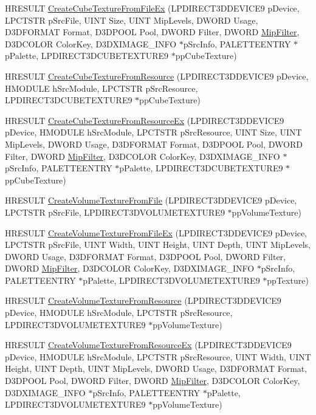 \begin{DoxyCompactItemize}
\item 
HRESULT \hyperlink{class_c_d_x_u_t_resource_cache_a3c03e924cfd9af63363f5976f266c14e}{CreateCubeTextureFromFileEx} (LPDIRECT3DDEVICE9 pDevice, LPCTSTR pSrcFile, UINT Size, UINT MipLevels, DWORD Usage, D3DFORMAT Format, D3DPOOL Pool, DWORD Filter, DWORD \hyperlink{shader_8fx_8c_a2d427a0f2ae0e99d2d700cf27d0417aa}{MipFilter}, D3DCOLOR ColorKey, D3DXIMAGE\_\-INFO $\ast$pSrcInfo, PALETTEENTRY $\ast$pPalette, LPDIRECT3DCUBETEXTURE9 $\ast$ppCubeTexture)
\item 
HRESULT \hyperlink{class_c_d_x_u_t_resource_cache_a778a88f6051a949abb95dc1923c13b83}{CreateCubeTextureFromResource} (LPDIRECT3DDEVICE9 pDevice, HMODULE hSrcModule, LPCTSTR pSrcResource, LPDIRECT3DCUBETEXTURE9 $\ast$ppCubeTexture)
\item 
HRESULT \hyperlink{class_c_d_x_u_t_resource_cache_afdf53d69820d5c0f5f9af4d7b51bd81a}{CreateCubeTextureFromResourceEx} (LPDIRECT3DDEVICE9 pDevice, HMODULE hSrcModule, LPCTSTR pSrcResource, UINT Size, UINT MipLevels, DWORD Usage, D3DFORMAT Format, D3DPOOL Pool, DWORD Filter, DWORD \hyperlink{shader_8fx_8c_a2d427a0f2ae0e99d2d700cf27d0417aa}{MipFilter}, D3DCOLOR ColorKey, D3DXIMAGE\_\-INFO $\ast$pSrcInfo, PALETTEENTRY $\ast$pPalette, LPDIRECT3DCUBETEXTURE9 $\ast$ppCubeTexture)
\item 
HRESULT \hyperlink{class_c_d_x_u_t_resource_cache_aeaf7cd870d8f048f32566aa2964e8b3e}{CreateVolumeTextureFromFile} (LPDIRECT3DDEVICE9 pDevice, LPCTSTR pSrcFile, LPDIRECT3DVOLUMETEXTURE9 $\ast$ppVolumeTexture)
\item 
HRESULT \hyperlink{class_c_d_x_u_t_resource_cache_a6fdd52b77094e786e6c4eb6d19c4ec11}{CreateVolumeTextureFromFileEx} (LPDIRECT3DDEVICE9 pDevice, LPCTSTR pSrcFile, UINT Width, UINT Height, UINT Depth, UINT MipLevels, DWORD Usage, D3DFORMAT Format, D3DPOOL Pool, DWORD Filter, DWORD \hyperlink{shader_8fx_8c_a2d427a0f2ae0e99d2d700cf27d0417aa}{MipFilter}, D3DCOLOR ColorKey, D3DXIMAGE\_\-INFO $\ast$pSrcInfo, PALETTEENTRY $\ast$pPalette, LPDIRECT3DVOLUMETEXTURE9 $\ast$ppTexture)
\item 
HRESULT \hyperlink{class_c_d_x_u_t_resource_cache_aa016831002fa2b54bd7cea38072c9a5c}{CreateVolumeTextureFromResource} (LPDIRECT3DDEVICE9 pDevice, HMODULE hSrcModule, LPCTSTR pSrcResource, LPDIRECT3DVOLUMETEXTURE9 $\ast$ppVolumeTexture)
\item 
HRESULT \hyperlink{class_c_d_x_u_t_resource_cache_a0ffaceddcccad20ae27475f698bd884d}{CreateVolumeTextureFromResourceEx} (LPDIRECT3DDEVICE9 pDevice, HMODULE hSrcModule, LPCTSTR pSrcResource, UINT Width, UINT Height, UINT Depth, UINT MipLevels, DWORD Usage, D3DFORMAT Format, D3DPOOL Pool, DWORD Filter, DWORD \hyperlink{shader_8fx_8c_a2d427a0f2ae0e99d2d700cf27d0417aa}{MipFilter}, D3DCOLOR ColorKey, D3DXIMAGE\_\-INFO $\ast$pSrcInfo, PALETTEENTRY $\ast$pPalette, LPDIRECT3DVOLUMETEXTURE9 $\ast$ppVolumeTexture)

\end{DoxyCompactItemize}
